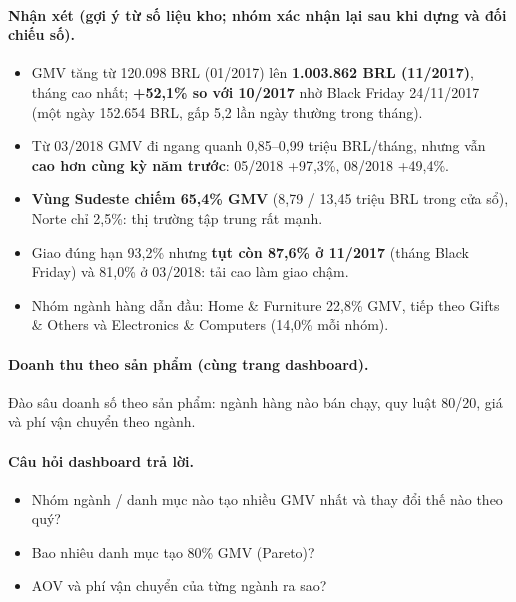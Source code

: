 

\paragraph{Nhận xét (gợi ý từ số liệu kho; \textbf{nhóm xác nhận lại sau khi dựng và đối chiếu số}).}

\begin{itemize}
  \item GMV tăng từ 120.098 BRL (01/2017) lên \textbf{1.003.862 BRL (11/2017)}, tháng cao nhất; \textbf{+52,1\% so với 10/2017} nhờ Black Friday 24/11/2017 (một ngày 152.654 BRL, gấp 5,2 lần ngày thường trong tháng).
  \item Từ 03/2018 GMV đi ngang quanh 0,85–0,99 triệu BRL/tháng, nhưng vẫn \textbf{cao hơn cùng kỳ năm trước}: 05/2018 +97,3\%, 08/2018 +49,4\%.
  \item \textbf{Vùng Sudeste chiếm 65,4\% GMV} (8,79 / 13,45 triệu BRL trong cửa sổ), Norte chỉ 2,5\%: thị trường tập trung rất mạnh.
  \item Giao đúng hạn 93,2\% nhưng \textbf{tụt còn 87,6\% ở 11/2017} (tháng Black Friday) và 81,0\% ở 03/2018: tải cao làm giao chậm.
  \item Nhóm ngành hàng dẫn đầu: Home \& Furniture 22,8\% GMV, tiếp theo Gifts \& Others và Electronics \& Computers (14,0\% mỗi nhóm).
\end{itemize}

\paragraph{Doanh thu theo sản phẩm (cùng trang dashboard).}

Đào sâu doanh số theo sản phẩm: ngành hàng nào bán chạy, quy luật 80/20, giá và phí vận chuyển theo ngành.

\paragraph{Câu hỏi dashboard trả lời.}

\begin{itemize}
  \item Nhóm ngành / danh mục nào tạo nhiều GMV nhất và thay đổi thế nào theo quý?
  \item Bao nhiêu danh mục tạo 80\% GMV (Pareto)?
  \item AOV và phí vận chuyển của từng ngành ra sao?
\end{itemize}

